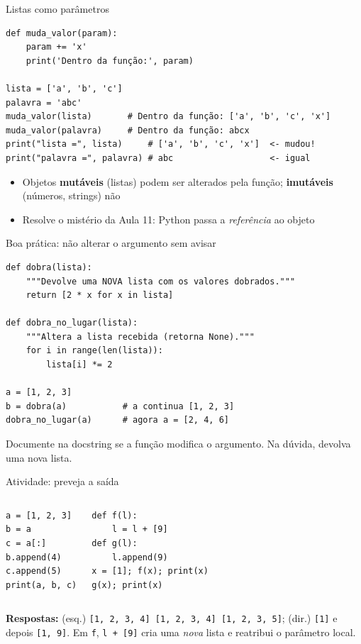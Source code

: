\documentclass[aspectratio=169,10pt,t]{beamer}
\begin{document}
\begin{frame}[fragile]{Listas como parâmetros}
\begin{lstlisting}
def muda_valor(param):
    param += 'x'
    print('Dentro da função:', param)

lista = ['a', 'b', 'c']
palavra = 'abc'
muda_valor(lista)       # Dentro da função: ['a', 'b', 'c', 'x']
muda_valor(palavra)     # Dentro da função: abcx
print("lista =", lista)     # ['a', 'b', 'c', 'x']  <- mudou!
print("palavra =", palavra) # abc                   <- igual
\end{lstlisting}
  \begin{itemize}
    \item Objetos \textbf{mutáveis} (listas) podem ser alterados pela função; \textbf{imutáveis} (números, strings) não
    \item Resolve o mistério da Aula 11: Python passa a \emph{referência} ao objeto
  \end{itemize}
\end{frame}

\begin{frame}[fragile]{Boa prática: não alterar o argumento sem avisar}
\begin{lstlisting}
def dobra(lista):
    """Devolve uma NOVA lista com os valores dobrados."""
    return [2 * x for x in lista]

def dobra_no_lugar(lista):
    """Altera a lista recebida (retorna None)."""
    for i in range(len(lista)):
        lista[i] *= 2

a = [1, 2, 3]
b = dobra(a)           # a continua [1, 2, 3]
dobra_no_lugar(a)      # agora a = [2, 4, 6]
\end{lstlisting}
  \small Documente na docstring se a função modifica o argumento. Na dúvida, \alert{devolva uma nova lista}.
\end{frame}

\begin{frame}[fragile]{Atividade: preveja a saída}
  \begin{columns}[T]
\begin{lstlisting}[basicstyle=\ttfamily\scriptsize]
a = [1, 2, 3]
b = a
c = a[:]
b.append(4)
c.append(5)
print(a, b, c)
\end{lstlisting}
\begin{lstlisting}[basicstyle=\ttfamily\scriptsize]
def f(l):
    l = l + [9]
def g(l):
    l.append(9)
x = [1]; f(x); print(x)
g(x); print(x)
\end{lstlisting}
  \end{columns}
  \vspace{1ex}
  \small\textbf{Respostas:} (esq.) \texttt{[1, 2, 3, 4] [1, 2, 3, 4] [1, 2, 3, 5]}; (dir.) \texttt{[1]} e depois \texttt{[1, 9]}. Em \texttt{f}, \texttt{l + [9]} cria uma \emph{nova} lista e reatribui o parâmetro local.
\end{frame}
\end{document}
